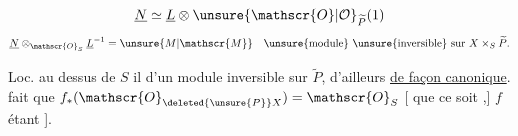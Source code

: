 \[
\underline{N}\simeq\underline{L}\otimes\unsure{\mathscr{O}|\mathcal{O}}_{\widetilde{P}}(1)
\]
\[
\underline{N}\otimes_{\mathscr{O}_{S}}\underline{L}^{-1}=\unsure{M|\mathscr{M}}
\quad\text{\unsure{module} \unsure{inversible} sur }X\times_{S}\widetilde{P}.
\]

Loc. au dessus de $S$ il  d'un module inversible sur $\widetilde{P}$, d'ailleurs \uline{de façon canonique}.  fait que $f_{*}(\mathscr{O}_{\deleted{\unsure{P}}X})=\mathscr{O}_{S}$ [  que ce soit  ,] $f$ étant   ].
